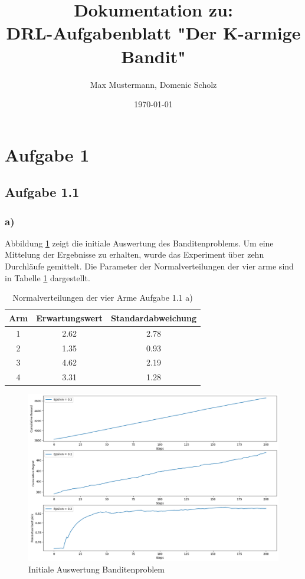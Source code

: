 \documentclass[11pt]{article}
\title{\textbf{Dokumentation zu:\\DRL-Aufgabenblatt "Der K-armige Bandit"}}
\author{ Max Mustermann, Domenic Scholz}
\date{\today}
\begin{document}
\maketitle	
\pagebreak


\section*{Aufgabe 1}
\subsection*{Aufgabe 1.1}
\subsubsection*{a)}
Abbildung \ref{img:1_1a} zeigt die initiale Auswertung des Banditenproblems. Um eine Mittelung der Ergebnisse zu erhalten, wurde das Experiment über zehn Durchläufe gemittelt. Die Parameter der Normalverteilungen der vier arme sind in Tabelle \ref{table:dist_1_1a} dargestellt.
\begin{table}[h]
    \centering
    \begin{tabular}{|c|c|c|}
        \hline
        Arm & Erwartungswert & Standardabweichung \\
        \hline
        1 & 2.62 & 2.78\\
        \hline
        2 & 1.35 & 0.93 \\
        \hline
        3 & 4.62 & 2.19\\
        \hline
        4 & 3.31 & 1.28\\
        \hline
    \end{tabular}
    \caption{Normalverteilungen der vier Arme Aufgabe 1.1 a)}
    \label{table:dist_1_1a}
\end{table}
\begin{figure}[h]
    \centering
    \includegraphics[width=\textwidth]{img/1_1a.png}
    \caption{Initiale Auswertung Banditenproblem}
    \label{img:1_1a}
\end{figure}
\end{document}
